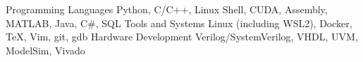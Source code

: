 
\begin{cvskills}

  \cvskill
    {Programming Languages} %
    {Python, C/C++, Linux Shell, CUDA, Assembly, MATLAB, Java, C\#, SQL} %
  \cvskill
    {Tools and Systems} %
    {Linux (including WSL2), Docker, TeX, Vim, git, gdb} %
  \cvskill
    {Hardware Development} %
    {Verilog/SystemVerilog, VHDL, UVM, ModelSim, Vivado} %
    
\end{cvskills}
